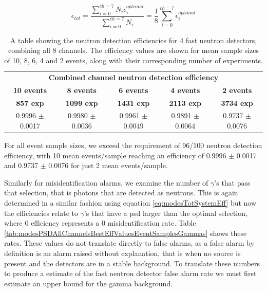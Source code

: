 \begin{equation}
\epsilon_{tot} = \frac{\sum^{ch=7}_{i=0}{N_{i}\epsilon^{optimal}_{i}}}{\sum^{ch=7}_{i=0}{N_{i}}} =\frac{1}{8}\sum^{ch=7}_{i=0}\epsilon^{optimal}_{i}
\label{eq:modesTotSystemEff}
\end{equation}

\begin{table}[h]
\centering
	\begin{tabular}{ccccc}
	\hline
	\hline
	\multicolumn{5}{c}{\textbf{Combined channel neutron detection efficiency}} \\
	\small{\textbf{10 events}} & \small{\textbf{8 events}} & \small{\textbf{6 events}} & \small{\textbf{4 events}}& \small{\textbf{2 events}}\\
        \small{\textbf{857 exp}} & \small{\textbf{1099 exp}} & \small{\textbf{1431 exp}} & \small{\textbf{2113 exp}}& \small{\textbf{3734 exp}}\\
	\hline
	 \small{0.9996 $\pm$ 0.0017} & \small{0.9980 $\pm$ 0.0036} & \small{0.9961 $\pm$ 0.0049} & \small{0.9891 $\pm$ 0.0064} & \small{0.9737 $\pm$ 0.0076}\\ 
	\hline
	\hline
\end{tabular}
\caption{A table showing the neutron detection efficiencies for 4 fast neutron detectors, combining all 8 channels. The efficiency values are shown for mean sample sizes of 10, 8, 6, 4 and 2 events, along with their corresponding number of experiments.}
\label{tab:modesPSDAllChannelsBestEffValuesEventSamplesNeutrons}
\end{table}

For all event sample sizes, we exceed the requirement of 96/100 neutron detection efficiency, with 10 mean events/sample reaching an efficiency of 0.9996 $\pm$ 0.0017 and 0.9737 $\pm$ 0.0076 for just 2 mean events/sample.

Similarly for misidentification alarms, we examine the number of $\gamma$'s that pass that selection, that is photons that are detected as neutrons. This is again determined in a similar fashion using equation \ref{eq:modesTotSystemEff} but now the efficiencies relate to $\gamma$'s that have a psd larger than the optimal selection, where 0 efficiency represents a 0 misidentification rate. Table \ref{tab:modesPSDAllChannelsBestEffValuesEventSamplesGammas} shows these rates. These values do not translate directly to false alarms, as a false alarm by definition is an alarm raised without explanation, that is when no source is present and the detectors are in a stable background. To translate these numbers to produce a estimate of the fast neutron detector false alarm rate we must first estimate an upper bound for the gamma background.

